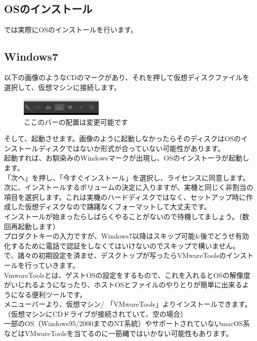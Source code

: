 \documentclass[b5paper,9pt,platex,dvipdfmx]{jsarticle}
\begin{document}
\begin{multicols*}{3}
{\section{OSのインストール}
では実際にOSのインストールを行います。\\
\subsection{Windows7}
以下の画像のようなCDのマークがあり、それを押して仮想ディスクファイルを選択して、仮想マシンに接続します。\\
\begin{figure}[H]
  \centering
  \includegraphics[width=4cm]{3.png}
  \caption{ここのバーの配置は変更可能です}
\end{figure}
そして、起動させます。画像のように起動しなかったらそのディスクはOSのインストールディスクではないか形式が合っていない可能性があります。\\
起動すれば、お馴染みのWindowsマークが出現し、OSのインストーラが起動します。\\
「次へ」を押し、「今すぐインストール」を選択し、ライセンスに同意します。\\
次に、インストールするボリュームの決定に入りますが、実機と同じく非割当の項目を選択します。これは実機のハードディスクではなく、セットアップ時に作成した仮想ディスクなので躊躇なくフォーマットして大丈夫です。\\
インストールが始まったらしばらくやることがないので待機してましょう。（数回再起動します）\\
プロダクトキーの入力ですが、Windows7以降はスキップ可能\&後でどうせ有効化するために電話で認証をしなくてはいけないのでスキップで構いません。\\
で、諸々の初期設定を済ませ、デスクトップが写ったらVMwareToolsのインストールを行っていきます。\\
VmwareToolsとは、ゲストOSの設定をするもので、これを入れるとOSの解像度がいじれるようになったり、ホストOSとファイルのやりとりが簡単に出来るようになる便利ツールです。\\
メニューバーより、仮想マシン/ 「VMwareTools」よりインストールできます。（仮想マシンにCDドライブが接続されていて、空の場合）\\
一部のOS（Windows95/2000までのNT系統）やサポートされていないmacOS系などはVMwareToolsを当てるのに一筋縄ではいかない可能性もあります。\\
}
\end{multicols*}
\end{document}
